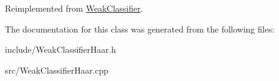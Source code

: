 Reimplemented from \hyperlink{classWeakClassifier_ad4c967e2f0d186a841722f8fea9dbd9c}{Weak\+Classifier}.



The documentation for this class was generated from the following files\+:\begin{DoxyCompactItemize}
\item 
include/Weak\+Classifier\+Haar.\+h\item 
src/Weak\+Classifier\+Haar.\+cpp\end{DoxyCompactItemize}
